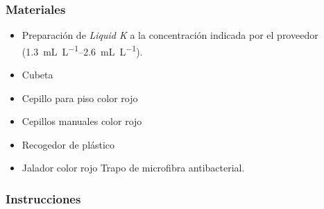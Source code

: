 \subsubsection{Materiales}

\begin{itemize}
	\item Preparación de \textit{Liquid K} a la concentración indicada por el proveedor (\qtyrange{1.3}{2.6}{\milli\liter\per\liter}).
	\item Cubeta
	\item Cepillo para piso color rojo
	\item Cepillos manuales color rojo
	\item Recogedor de plástico
	\item Jalador color rojo
Trapo de microfibra antibacterial.
\end{itemize}

\subsubsection{Instrucciones}
